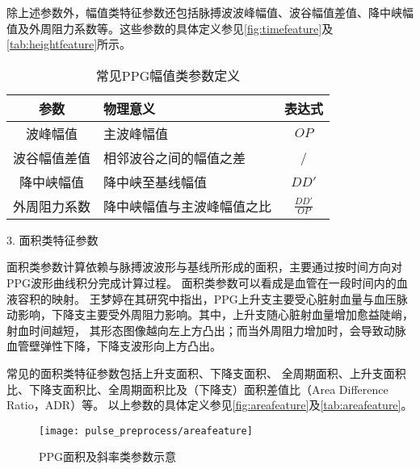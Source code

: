 除上述参数外，幅值类特征参数还包括脉搏波波峰幅值、波谷幅值差值、降中峡幅值及外周阻力系数等\cite{cwl,mmt}。这些参数的具体定义参见\autoref{fig:timefeature}及\autoref{tab:heightfeature}所示。
\begin{table}[htbp]
    \centering
    \caption{\label{tab:heightfeature}常见PPG幅值类参数定义}
    \begin{tabularx}{\linewidth}{cX<{\centering}c}
    \toprule
    \textbf{参数} & \textbf{物理意义} & \textbf{表达式} \\
    \midrule
    波峰幅值      &  主波峰幅值         &  $OP$\\
    波谷幅值差值      &  相邻波谷之间的幅值之差         &  /\\
    降中峡幅值      &  降中峡至基线幅值         &  $DD'$\\
    外周阻力系数      &  降中峡幅值与主波峰幅值之比         &  $\frac{DD'}{OP}$\\
    \bottomrule
    \end{tabularx}
\end{table}

3. 面积类特征参数

面积类参数计算依赖与脉搏波波形与基线所形成的面积，主要通过按时间方向对PPG波形曲线积分完成计算过程。
面积类参数可以看成是血管在一段时间内的血液容积的映射。
王梦婷在其研究中指出\cite{mmt}，PPG上升支主要受心脏射血量与血压脉动影响，下降支主要受外周阻力影响。其中，上升支随心脏射血量增加愈益陡峭，射血时间越短，
其形态图像越向左上方凸出；而当外周阻力增加时，会导致动脉血管壁弹性下降，下降支波形向上方凸出。

常见的面积类特征参数包括上升支面积、下降支面积、
全周期面积、上升支面积比、下降支面积比、全周期面积比及（下降支）面积差值比（Area Difference Ratio，ADR）\cite{Feng2018}等。
以上参数的具体定义参见\autoref{fig:areafeature}及\autoref{tab:areafeature}。
\begin{figure}[htbp]
    \centering
    \texttt{[image: pulse\_preprocess/areafeature]}
    \caption{\label{fig:areafeature}PPG面积及斜率类参数示意}
\end{figure}

